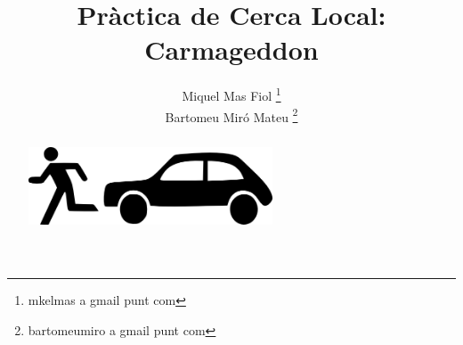 \documentclass[a4paper,11pt]{scrartcl}
\title{Pràctica de Cerca Local: \\ \huge{Carmageddon}}
\author{ Miquel Mas Fiol \thanks{mkelmas a gmail punt com} \\
	 Bartomeu Miró Mateu \thanks{bartomeumiro a gmail punt com} \\}
\begin{document}
  \maketitle

  \begin{abstract}
    \begin{center}
      \includegraphics[width=0.6\textwidth]{figures/carmageddon-logo.png}
    \end{center}
  \end{abstract}

  \newpage
  \setcounter{page}{2}
  \tableofcontents
  \newpage

  
  \newpage
  
  \newpage
  
  \newpage
  
  \newpage
  
  \newpage

  
\end{document}
